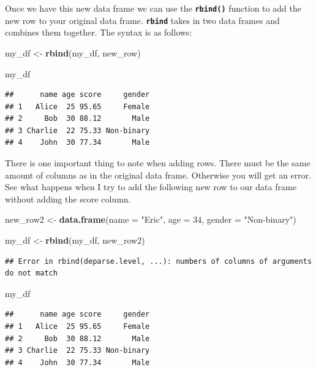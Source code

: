 \documentclass[
]{book}
\newenvironment{Shaded}{\begin{snugshade}}{\end{snugshade}}
\newcommand{\AttributeTok}[1]{\textcolor[rgb]{0.13,0.29,0.53}{#1}}
\newcommand{\DecValTok}[1]{\textcolor[rgb]{0.00,0.00,0.81}{#1}}
\newcommand{\FunctionTok}[1]{\textcolor[rgb]{0.13,0.29,0.53}{\textbf{#1}}}
\newcommand{\NormalTok}[1]{#1}
\newcommand{\OtherTok}[1]{\textcolor[rgb]{0.56,0.35,0.01}{#1}}
\newcommand{\StringTok}[1]{\textcolor[rgb]{0.31,0.60,0.02}{#1}}
\begin{document}
Once we have this new data frame we can use the \textbf{\texttt{rbind()}} function to add the new row to your original data frame. \textbf{\texttt{rbind}} takes in two data frames and combines them together. The syntax is as follows:

\begin{Shaded}
\begin{Highlighting}[]
\NormalTok{my\_df }\OtherTok{\textless{}{-}} \FunctionTok{rbind}\NormalTok{(my\_df, new\_row)}

\NormalTok{my\_df}
\end{Highlighting}
\end{Shaded}

\begin{verbatim}
##      name age score     gender
## 1   Alice  25 95.65     Female
## 2     Bob  30 88.12       Male
## 3 Charlie  22 75.33 Non-binary
## 4    John  30 77.34       Male
\end{verbatim}

There is one important thing to note when adding rows. There must be the same amount of columns as in the original data frame. Otherwise you will get an error. See what happens when I try to add the following new row to our data frame without adding the score column.

\begin{Shaded}
\begin{Highlighting}[]
\NormalTok{new\_row2 }\OtherTok{\textless{}{-}} \FunctionTok{data.frame}\NormalTok{(}\AttributeTok{name =} \StringTok{"Eric"}\NormalTok{, }\AttributeTok{age =} \DecValTok{34}\NormalTok{, }\AttributeTok{gender =} \StringTok{"Non{-}binary"}\NormalTok{)}

\NormalTok{my\_df }\OtherTok{\textless{}{-}} \FunctionTok{rbind}\NormalTok{(my\_df, new\_row2)}
\end{Highlighting}
\end{Shaded}

\begin{verbatim}
## Error in rbind(deparse.level, ...): numbers of columns of arguments do not match
\end{verbatim}

\begin{Shaded}
\begin{Highlighting}[]
\NormalTok{my\_df}
\end{Highlighting}
\end{Shaded}

\begin{verbatim}
##      name age score     gender
## 1   Alice  25 95.65     Female
## 2     Bob  30 88.12       Male
## 3 Charlie  22 75.33 Non-binary
## 4    John  30 77.34       Male
\end{verbatim}
\end{document}
